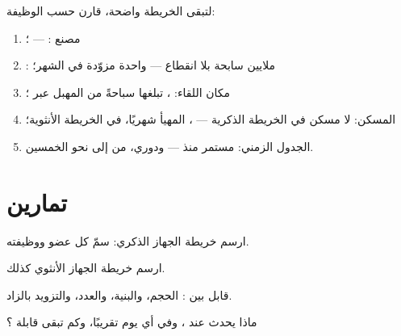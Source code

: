 \begin{method}\label{met:g8:reproductive-systems:sides}
لتبقى الخريطة واضحة، قارن حسب الوظيفة:
\begin{enumerate}
  \item مصنع :  --- ؛
  \item {}: ملايين سابحة بلا انقطاع ---  واحدة
        مزوّدة في الشهر؛
  \item مكان اللقاء: ، تبلغها  سباحةً من
        المهبل عبر ؛
  \item المسكن: لا مسكن في الخريطة الذكرية --- ،
        المهيأ شهريًا، في الخريطة الأنثوية؛
  \item الجدول الزمني: مستمر منذ  --- ودوري، من
         إلى نحو الخمسين.
\end{enumerate}
\end{method}

\section{تمارين}

\begin{exercise}[$\star$]\label{exo:g8:reproductive-systems:1}
ارسم خريطة الجهاز الذكري: سمّ كل عضو ووظيفته.
\end{exercise}

\begin{exercise}[$\star$]\label{exo:g8:reproductive-systems:2}
ارسم خريطة الجهاز الأنثوي كذلك.
\end{exercise}

\begin{exercise}[$\star$]\label{exo:g8:reproductive-systems:3}
قابل بين  : الحجم، والبنية، والعدد،
والتزويد بالزاد.
\end{exercise}

\begin{exercise}[$\star$]\label{exo:g8:reproductive-systems:4}
ماذا يحدث عند ، وفي أي يوم تقريبًا، وكم تبقى
 قابلة ؟
\end{exercise}

